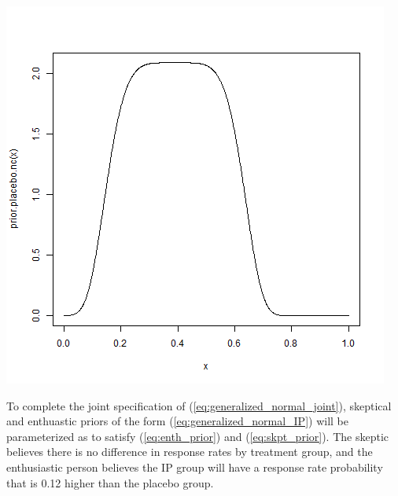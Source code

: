 \documentclass[12pt]{article}
\begin{document}
		\begin{center}
\includegraphics[scale=0.50]{./FIGURES/figure5a.png}
    \end{center}	




To complete the joint specification of (\ref{eq:generalized_normal_joint}), skeptical and enthuastic priors of the form (\ref{eq:generalized_normal_IP}) will be parameterized as to satisfy (\ref{eq:enth_prior}) and (\ref{eq:skpt_prior}). The skeptic believes there is no difference in response rates by treatment group, and the enthusiastic person believes the IP group will have a response rate probability that is 0.12 higher than the placebo group. 

%
\end{document}
